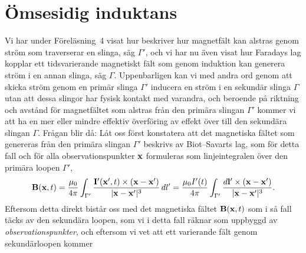 {{{{\section{{\"O}msesidig induktans}
Vi har under F{\"o}rel{\"a}sning~4 visat hur  beskriver
hur magnetf{\"a}lt kan alstras genom str{\"o}m som traverserar en slinga,
s{\"a}g $\Gamma'$, och vi har nu {\"a}ven visat hur Faradays lag kopplar ett
tidsvarierande magnetiskt f{\"a}lt som genom induktion kan generera str{\"o}m
i en annan slinga, s{\"a}g $\Gamma$.
Uppenbarligen kan vi med andra ord genom att skicka str{\"o}m genom en
prim{\"a}r slinga $\Gamma'$ inducera en str{\"o}m i en sekund{\"a}r slinga
$\Gamma$ utan att dessa slingor har fysisk kontakt med varandra, och beroende
p{\aa} riktning och avst{\aa}nd f{\"o}r magnetf{\"a}ltet som alstras fr{\aa}n
den prim{\"a}ra slingan $\Gamma'$ kommer vi att ha en mer eller mindre effektiv
{\"o}verf{\"o}ring av effekt {\"o}ver till den sekund{\"a}ra slingan $\Gamma$.
\noindent
Fr{\aa}gan blir d{\aa}:
\noindent
L{\aa}t oss f{\"o}rst konstatera att det magnetiska f{\"a}ltet som genereras
fr{\aa}n den prim{\"a}ra slingan
$\Gamma'$ beskrivs av Biot--Savarts lag, som f{\"o}r detta fall och f{\"o}r
alla observationspunkter ${\bf x}$ formuleras som
linjeintegralen
{\"o}ver den prim{\"a}ra loopen $\Gamma'$,
$$
  {\bf B}({\bf x},t)={{\mu_0}\over{4\pi}}\int_{\Gamma'}
    {{{\bf I}'({\bf x}',t)\times({\bf x}-{\bf x}')}
      \over{|{\bf x}-{\bf x}'|^3}}\,dl'
    ={{\mu_0 I'(t)}\over{4\pi}}\int_{\Gamma'}
      {{d{\bf l}'\times({\bf x}-{\bf x}')}\over{|{\bf x}-{\bf x}'|^3}}.
$$
Eftersom detta direkt bist{\aa}r oss med det magnetiska f{\"a}ltet
${\bf B}({\bf x},t)$ som i s{\aa} fall t{\"a}cks av den sekund{\"a}ra loopen,
som vi i detta fall r{\"a}knar som uppbyggd av {\it observationspunkter}, och
eftersom vi vet att ett varierande f{\"a}lt genom sekund{\"a}rloopen kommer
}}}}
